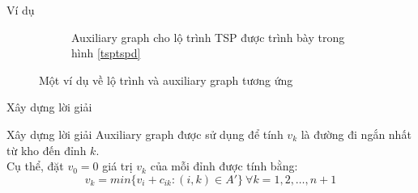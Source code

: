 \documentclass[compress]{beamer}
\begin{document}
\begin{frame}{Ví dụ}
\begin{figure}
\begin{subfigure}{0.65\textwidth}
\begin{tikzpicture}[scale=0.5,every node/.style={scale=0.5},
state/.style ={circle,draw},state1/.style ={circle,dashed,draw}]
\end{tikzpicture}
\caption{Auxiliary graph cho lộ trình TSP được trình bày trong hình \ref{tsptspd}}\label{augraph}
\end{subfigure}
\caption{Một ví dụ về lộ trình và auxiliary graph tương ứng}
\label{vd1}
\end{figure}
\end{frame}
\begin{frame}{Xây dựng lời giải}
\begin{block}{Xây dựng lời giải}
 Auxiliary graph được sử dụng để tính $v_k$ là đường đi ngắn nhất từ kho đến đỉnh $k$.\\
Cụ thể, đặt $v_0=0$ giá trị $v_k$ của mỗi đỉnh được tính bằng: 
$$v_k=min\{v_i+c_{ik}:(i,k) \in A'\} \ \forall k=1,2,\ldots,n+1$$
\end{block}
\end{frame}
\end{document}
